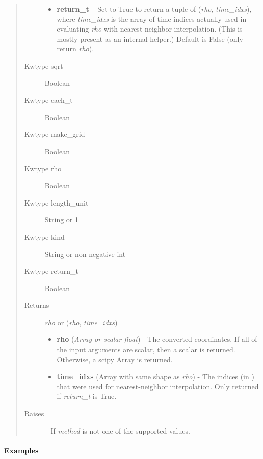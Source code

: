 \documentclass[letterpaper,10pt,english]{sphinxmanual}
\begin{document}
\begin{fulllineitems}
\begin{fulllineitems}
\begin{quote}
\begin{description}
\begin{itemize}
\item {} 
\textbf{return\_t} -- Set to True to return a tuple of (\emph{rho},
\emph{time\_idxs}), where \emph{time\_idxs} is the array of time indices
actually used in evaluating \emph{rho} with nearest-neighbor
interpolation. (This is mostly present as an internal helper.)
Default is False (only return \emph{rho}).

\end{itemize}

\item[{Kwtype sqrt}] \leavevmode
Boolean

\item[{Kwtype each\_t}] \leavevmode
Boolean

\item[{Kwtype make\_grid}] \leavevmode
Boolean

\item[{Kwtype rho}] \leavevmode
Boolean

\item[{Kwtype length\_unit}] \leavevmode
String or 1

\item[{Kwtype kind}] \leavevmode
String or non-negative int

\item[{Kwtype return\_t}] \leavevmode
Boolean

\item[{Returns}] \leavevmode

\emph{rho} or (\emph{rho}, \emph{time\_idxs})
\begin{itemize}
\item {} 
\textbf{rho} (\emph{Array or scalar float}) - The converted coordinates. If
all of the input arguments are scalar, then a scalar is returned.
Otherwise, a scipy Array is returned.

\item {} 
\textbf{time\_idxs} (Array with same shape as \emph{rho}) - The indices
(in ) that were used for
nearest-neighbor interpolation. Only returned if \emph{return\_t} is
True.

\end{itemize}


\item[{Raises}] \leavevmode
{} -- If \emph{method} is not one of the supported values.

\end{description}\end{quote}
\paragraph{Examples}


\end{fulllineitems}
\end{fulllineitems}
\end{document}

